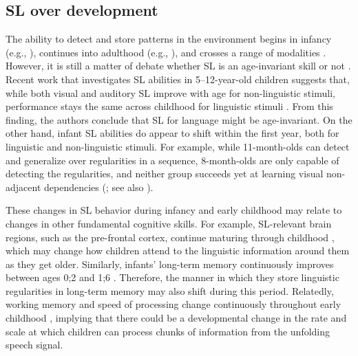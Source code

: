 \documentclass{article}
\begin{document}
\subsection{SL over development}
The ability to detect and store patterns in the environment begins in infancy (e.g., ), continues into adulthood (e.g., ), and crosses a range of modalities \cite{conway2005modality, emberson2011timing, monroy2017toddlers}. However, it is still a matter of debate whether SL is an age-invariant skill or not \cite{arciuli2011statistical, raviv2018developmental, shufaniya2018statistical, saffran1997incidental}. Recent work that investigates SL abilities in 5--12-year-old children suggests that, while both visual and auditory SL improve with age for non-linguistic stimuli, performance stays the same across childhood for linguistic stimuli \cite{raviv2018developmental, shufaniya2018statistical}. From this finding, the authors conclude that SL for language might be age-invariant. On the other hand, infant SL abilities do appear to shift within the first year, both for linguistic \cite{kidd2018individual} and non-linguistic \cite{johnson2009abstract} stimuli. For example, while 11-month-olds can detect and generalize over regularities in a sequence, 8-month-olds are only capable of detecting the regularities, and neither group succeeds yet at learning visual non-adjacent dependencies (; see also ).

These changes in SL behavior during infancy and early childhood may relate to changes in other fundamental cognitive skills. For example, SL-relevant brain regions, such as the pre-frontal cortex, continue maturing through childhood \cite{casey2000structural, diamond2002normal, rodriguez2009neurophysiological, uylings2006development}, which may change how children attend to the linguistic information around them as they get older. Similarly, infants' long-term memory continuously improves between ages 0;2 and 1;6 \cite{bauer2005developments, wojcik2013remembering}. Therefore, the manner in which they store linguistic regularities in long-term memory may also shift during this period. Relatedly, working memory and speed of processing change continuously throughout early childhood \cite{gathercole2004structure, kail1991developmental}, implying that there could be a developmental change in the rate and scale at which children can process chunks of information from the unfolding speech signal.
\end{document}
